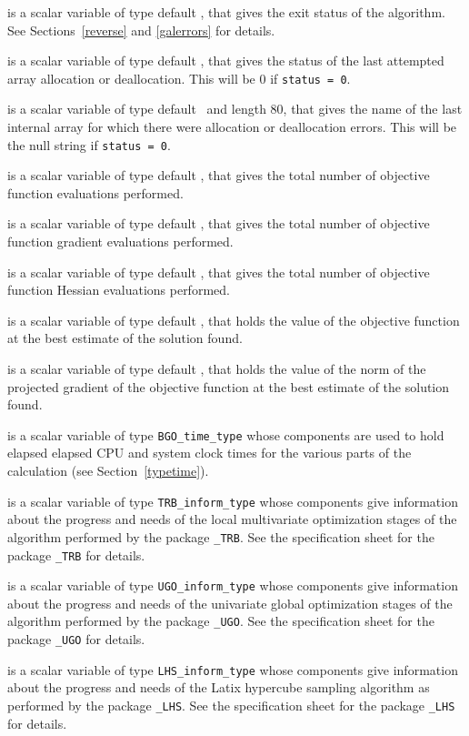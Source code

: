 \documentclass{galahad}
\newcommand{\packagename}{BGO}
\begin{document}
\begin{description}
 is a scalar variable of type default \integer, that gives the
exit status of the algorithm.
See Sections~\ref{reverse} and \ref{galerrors}
for details.

 is a scalar variable of type default \integer, that gives
the status of the last attempted array allocation or deallocation.
This will be 0 if {\tt status = 0}.

 is a scalar variable of type default \character\
and length 80, that  gives the name of the last internal array
for which there were allocation or deallocation errors.
This will be the null string if {\tt status = 0}.

 is a scalar variable of type default \integer, that gives the
total number of objective function evaluations performed.

 is a scalar variable of type default \integer, that gives the
total number of objective function gradient evaluations performed.

 is a scalar variable of type default \integer, that gives the
total number of objective function Hessian evaluations performed.

 is a scalar variable of type default \realdp, that holds the
value of the objective function at the best estimate of the solution found.

 is a scalar variable of type default \realdp, that holds the
value of the norm of the projected gradient of the objective function 
at the best estimate of the solution found.

 is a scalar variable of type {\tt \packagename\_time\_type}
whose components are used to hold elapsed elapsed CPU and system clock
times for the various parts of the calculation (see Section~\ref{typetime}).

 is a scalar variable of type
{\tt TRB\_inform\_type}
whose components give information about the progress and needs of the local
multivariate optimization stages of the algorithm performed by the package
{\tt \libraryname\_TRB}.
See the specification sheet for the package
{\tt \libraryname\_TRB}
for details.

 is a scalar variable of type
{\tt UGO\_inform\_type}
whose components give information about the progress and needs of the 
univariate global optimization stages of the algorithm performed by the package
{\tt \libraryname\_UGO}.
See the specification sheet for the package
{\tt \libraryname\_UGO}
for details.

 is a scalar variable of type
{\tt LHS\_inform\_type}
whose components give information about the progress and needs
of the Latix hypercube sampling algorithm as performed by the package
{\tt \libraryname\_LHS}.
See the specification sheet for the package
{\tt \libraryname\_LHS}
for details.

\end{description}
\end{document}

